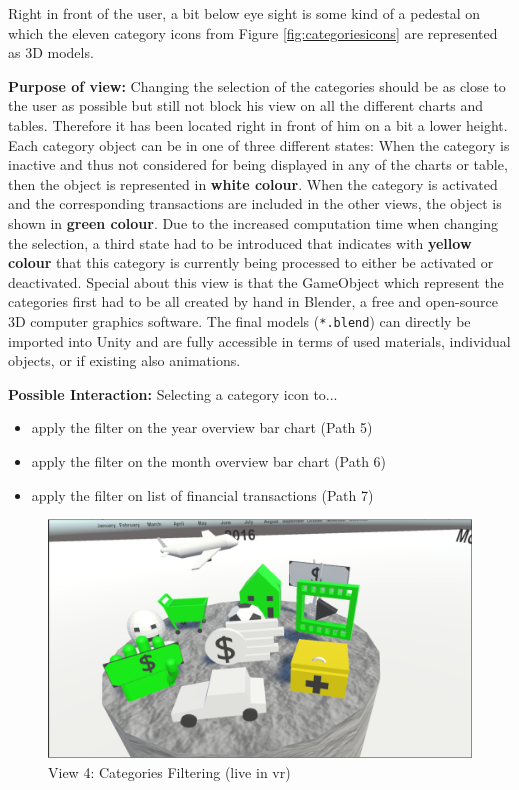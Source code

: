 Right in front of the user, a bit below eye sight is some kind of a pedestal on which the eleven category icons from Figure \ref{fig:categoriesicons} are represented as 3D models. 

\textbf{Purpose of view:} Changing the selection of the categories should be as close to the user as possible but still not block his view on all the different charts and tables. Therefore it has been located right in front of him on a bit a lower height. Each category object can be in one of three different states: When the category is inactive and thus not considered for being displayed in any of the charts or table, then the object is represented in \textbf{white colour}. When the category is activated and the corresponding transactions are included in the other views, the object is shown in \textbf{green colour}. Due to the increased computation time when changing the selection, a third state had to be introduced that indicates with \textbf{yellow colour} that this category is currently being processed to either be activated or deactivated. \newline
Special about this view is that the GameObject which represent the categories first had to be all created by hand in Blender, a free and open-source 3D computer graphics software. The final models (\texttt{*.blend}) can directly be imported into Unity and are fully accessible in terms of used materials, individual objects, or if existing also animations.

\textbf{Possible Interaction:} Selecting a category icon to...
\begin{itemize}[noitemsep,nolistsep]
	\item apply the filter on the year overview bar chart (Path 5)
	\item apply the filter on the month overview bar chart (Path 6)
	\item apply the filter on list of financial transactions (Path 7)
\end{itemize}

\begin{figure}[h]
	\begin{center}
		\includegraphics[width=12cm]{03_Figures/08_Development/View4_CategoriesFiltering_Loading.png}
		\caption{View 4: Categories Filtering (live in \gls{vr})}
		\label{fig:unityview4}
	\end{center}
\end{figure}


